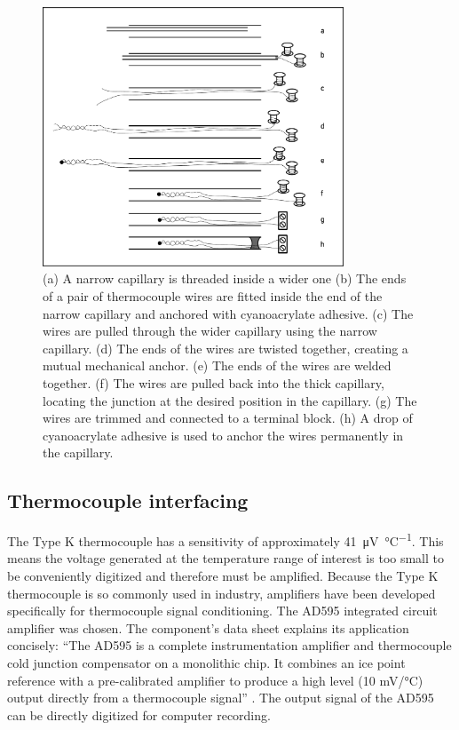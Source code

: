 \begin{figure}
	\centering
	\includegraphics[width=0.8\textwidth]{Figures/FineWireThermocouple.pdf}
	\decoRule
	
\caption[A cartoon explaining how to construct a long, thin thermocouple
probe.]{(a) A narrow capillary is threaded inside a wider one (b) The ends of a
pair of thermocouple wires are fitted inside the end of the narrow capillary and
anchored with cyanoacrylate adhesive. (c) The wires are pulled through the
wider capillary using the narrow capillary. (d) The ends of the wires are twisted
together, creating a mutual mechanical anchor.
(e) The ends of the wires are welded together. (f) The wires are pulled back
into the thick capillary, locating the junction at the desired position in the
capillary. (g) The wires are trimmed and connected to a terminal block. (h) A
drop of cyanoacrylate adhesive is used to anchor the wires permanently in the
capillary. }
	
	\label{fig:FineWireThermocouple}
\end{figure}

\subsection{Thermocouple interfacing}

The Type K thermocouple has a sensitivity of approximately
\SI{41}{\micro\volt\per\celsius}. This means the voltage generated at the
temperature range of interest is too small to be conveniently digitized and
therefore must be amplified. Because the Type K thermocouple is so commonly used
in industry, amplifiers have been developed specifically for thermocouple signal
conditioning. The AD595 integrated circuit amplifier was chosen. The component's
data sheet explains its application concisely: ``The AD595 is a complete
instrumentation amplifier and thermocouple cold junction compensator on a
monolithic chip. It combines an ice point reference with a pre-calibrated
amplifier to produce a high level (10 mV/°C) output directly from a thermocouple
signal'' \autocite{AD595}. The output signal of the AD595 can be directly
digitized for computer recording.


